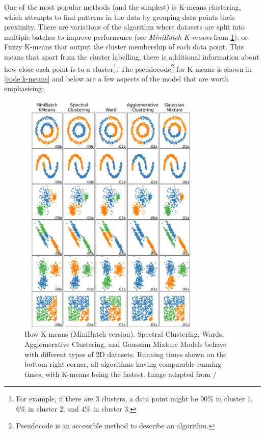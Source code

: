 One of the most popular methods (and the simplest) is K-means clustering, which attempts to find patterns in the data by grouping data points their proximity. There are variations of the algorithm where datasets are split into multiple batches to improve performance (see \textit{MiniBatch K-means} from \cref{fig:lit:clustering_types}); or Fuzzy K-means \citep{Bezdek1984-ao} that output the cluster membership of each data point. This means that apart from the cluster labelling, there is additional information about how close each point is to a cluster\footnote{For example, if there are 3 clusters, a data point might be 90\% in cluster 1, 6\% in cluster 2, and 4\% in cluster 3.}. The pseudocode\footnote{Pseudocode is an accessible method to describe an algorithm.} for K-means is shown in \cref{code:k-means} and below are a few aspects of the model that are worth emphasising:
\begin{figure}[!t]
  \centering
  \includegraphics[width=0.8\textwidth,height=0.5\textheight,keepaspectratio]{Sections/Lit_review/Resources/clustering_scikit.png}
    \caption[Clustering models on different datasets]{How K-means (MiniBatch version), Spectral Clustering, Wards, Agglomerative Clustering, and Gaussian Mixture Models behave with different types of 2D datasets. Running times shown on the bottom right corner, all algorithms having comparable running times, with K-means being the fastest. Image adapted from \citet{Scikit-learn_undated-ax}/}
    \label{fig:lit:clustering_types}
\end{figure}

